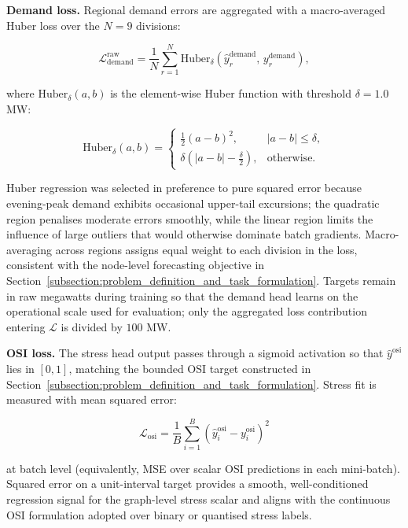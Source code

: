 \textbf{Demand loss.} Regional demand errors are aggregated with a macro-averaged Huber loss over the \(N = 9\) divisions:

\[
\mathcal{L}_{\mathrm{demand}}^{\mathrm{raw}} = \frac{1}{N} \sum_{r=1}^{N} \mathrm{Huber}_{\delta}\!\left(\hat{y}^{\mathrm{demand}}_r,\, y^{\mathrm{demand}}_r\right),
\]

where \(\mathrm{Huber}_{\delta}(a, b)\) is the element-wise Huber function with threshold \(\delta = 1.0\) MW:

\[
\mathrm{Huber}_{\delta}(a, b) =
\begin{cases}
\frac{1}{2}(a - b)^2, & |a - b| \le \delta, \\
\delta\left(|a - b| - \frac{\delta}{2}\right), & \text{otherwise}.
\end{cases}
\]

Huber regression was selected in preference to pure squared error because evening-peak demand exhibits occasional upper-tail excursions; the quadratic region penalises moderate errors smoothly, while the linear region limits the influence of large outliers that would otherwise dominate batch gradients. Macro-averaging across regions assigns equal weight to each division in the loss, consistent with the node-level forecasting objective in Section~\ref{subsection:problem_definition_and_task_formulation}. Targets remain in raw megawatts during training so that the demand head learns on the operational scale used for evaluation; only the aggregated loss contribution entering \(\mathcal{L}\) is divided by \(100\) MW.

\textbf{OSI loss.} The stress head output passes through a sigmoid activation so that \(\hat{y}^{\mathrm{osi}}\) lies in \([0, 1]\), matching the bounded OSI target constructed in Section~\ref{subsection:problem_definition_and_task_formulation}. Stress fit is measured with mean squared error:

\[
\mathcal{L}_{\mathrm{osi}} = \frac{1}{B}\sum_{i=1}^{B}\left(\hat{y}^{\mathrm{osi}}_i - y^{\mathrm{osi}}_i\right)^2
\]

at batch level (equivalently, MSE over scalar OSI predictions in each mini-batch). Squared error on a unit-interval target provides a smooth, well-conditioned regression signal for the graph-level stress scalar and aligns with the continuous OSI formulation adopted over binary or quantised stress labels.

